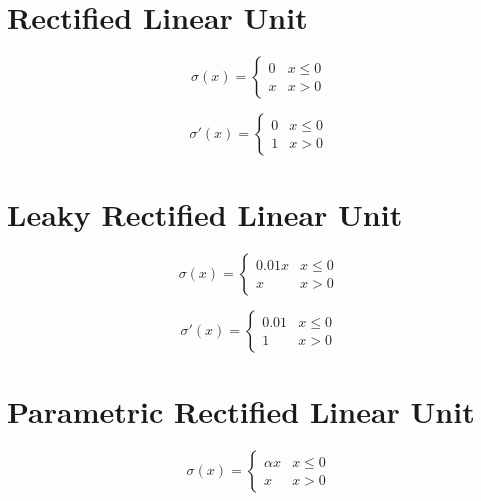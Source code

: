 \documentclass{article}
\begin{document}
\clearpage

\section{Rectified Linear Unit}

\begin{equation}
\sigma(x) =
  \begin{cases}
    0 & x \leq 0\\
    x & x > 0
  \end{cases}
\end{equation}

\begin{equation}
\sigma'(x) =
  \begin{cases}
    0 & x \leq 0\\
    1 & x > 0
  \end{cases}
\end{equation}

\clearpage

\section{Leaky Rectified Linear Unit}

\begin{equation}
  \sigma(x) =
    \begin{cases}
      0.01x & x \leq 0\\
      x & x > 0
    \end{cases}
\end{equation}
  
\begin{equation}
  \sigma'(x) =
    \begin{cases}
      0.01 & x \leq 0\\
      1 & x > 0
    \end{cases}
\end{equation}

\clearpage

\section{Parametric Rectified Linear Unit}

\begin{equation}
  \sigma(x) =
    \begin{cases}
      \alpha x & x \leq 0\\
      x & x > 0
    \end{cases}
\end{equation}
\end{document}
